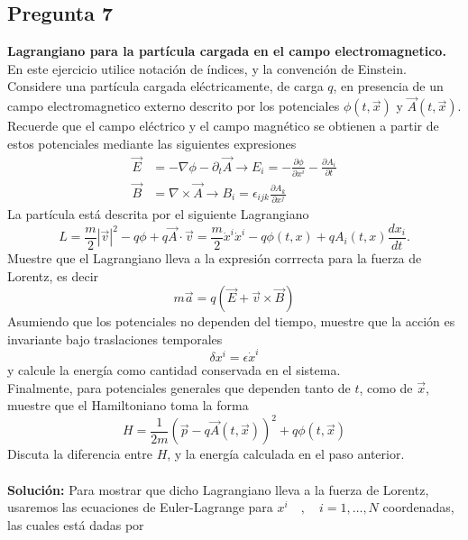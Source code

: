 \documentclass[../main_ej.tex]{subfiles}
\begin{document}
\subsection{Pregunta 7}
\textbf{Lagrangiano para la partícula cargada en el campo electromagnetico.} En este ejercicio utilice notación de índices, y la convención de Einstein. Considere una partícula cargada eléctricamente, de carga $q$, en presencia de un campo electromagnetico externo descrito por los potenciales $\phi(t,\vec{x})$ y $\vec{A}(t,\vec{x})$. Recuerde que el campo eléctrico y el campo magnético se obtienen a partir de estos potenciales mediante las siguientes expresiones
\begin{align*}
  \vec{E} & =-\nabla \phi - \partial_t\vec{A} \rightarrow E_i = -\frac{\partial \phi}{\partial x^i} - \frac{\partial A_i}{\partial t} \\
  \vec{B} & = \nabla \times \vec{A} \rightarrow B_i = \epsilon_{ijk}\frac{\partial A_k}{\partial x^j}
\end{align*}
La partícula está descrita por el siguiente Lagrangiano
\begin{equation*}
  L=\frac{m}{2}|\vec{v}|^2 - q\phi + q\vec{A}\cdot \vec{v} = \frac{m}{2}\dot{x}^i\dot{x}^i - q\phi(t,x) + qA_i(t,x) \frac{dx_i}{dt}.
\end{equation*}
Muestre que el Lagrangiano lleva a la expresión corrrecta para la fuerza de Lorentz, es decir
\begin{equation}
  m\vec{a}=q(\vec{E}+\vec{v}\times\vec{B})
\end{equation}
Asumiendo que los potenciales no dependen del tiempo, muestre que la acción es invariante bajo traslaciones temporales
\begin{equation}
  \delta x^i=\epsilon \dot{x}^i 
\end{equation}
y calcule la energía como cantidad conservada en el sistema. \\
Finalmente, para potenciales generales que dependen tanto de $t$, como de $\vec{x}$, muestre que el Hamiltoniano toma la forma
\begin{equation}
  H=\frac{1}{2m}\left( \vec{p}-q\vec{A}(t,\vec{x}) \right)^2 + q\phi(t,\vec{x})
\end{equation}
Discuta la diferencia entre $H$, y la energía calculada en el paso anterior. 
\\
\\
\textbf{Solución:}
Para mostrar que dicho Lagrangiano lleva a la fuerza de Lorentz, usaremos las ecuaciones de Euler-Lagrange para $x^i \quad , \quad i=1,\dots,N$ coordenadas, las cuales está dadas por
\end{document}
